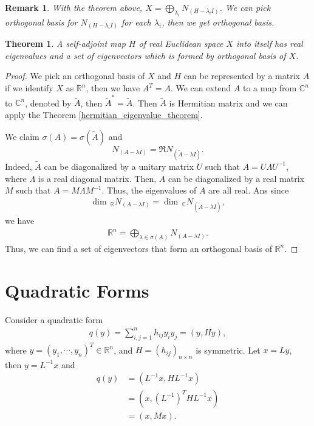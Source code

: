 \documentclass[11pt]{book}
\newtheorem{theorem}{Theorem}[chapter]
\newtheorem{remark}{Remark}[chapter]
\theoremstyle{definition}
\numberwithin{equation}{chapter}
\begin{document}
\medskip


\begin{remark}
With the theorem above, $X = \bigoplus_{\lambda_i}N_{(H-\lambda_i I)}$. We can pick orthogonal basis for $N_{(H-\lambda_i I)}$ for each $\lambda_i$, then we get orthogonal basis.
\end{remark}

\medskip

\begin{theorem}\label{theorem_symmetric}
A self-adjoint map $H$ of real Euclidean space $X$ into itself has real eigenvalues and a set of eigenvectors which is formed by orthogonal basis of $X$.
\end{theorem}
\begin{proof}
We pick an orthogonal basis of $X$ and $H$ can be represented by a matrix $A$ if we identify $X$ as $\mathbb{R}^n$, then we have $A^T = A$. We can extend $A$ to a map from $\mathbb{C}^n$ to $\mathbb{C}^n$, denoted by $\widetilde{A}$, then $\widetilde{A}^* = \widetilde{A}$. Then $\widetilde{A}$ is Hermitian matrix and we can apply the Theorem \ref{hermitian_eigenvalue_theorem}.

We claim $\sigma(A) = \sigma \left(\widetilde{A}\right)$ and $$N_{(A - \lambda I)} = \Re N_{\left(\widetilde{A} - \lambda I\right)}.$$
Indeed, $\widetilde{A}$ can be diagonalized by a unitary matrix $U$ such that $A = U\Lambda U^{-1}$, where $\Lambda$ is a real diagonal matrix. Then, $A$ can be diagonalized by a real matrix $M$ such that $A = M\Lambda M^{-1}$. Thus, the eigenvalues of $A$ are all real. Ans since
\begin{align*}
    \dim \,_{\mathbb{R}} N_{(A - \lambda I)} = \dim \,_{\mathbb{C}} N_{\left(\widetilde{A} - \lambda I\right)},
\end{align*}
we have 
\begin{align*}
    \mathbb{R}^n = \bigoplus_{\lambda \in \sigma(A)} N_{(A - \lambda I)}.
\end{align*}
Thus, we can find a set of eigenvectors that form an orthogonal basis of $\mathbb{R}^n$.
\end{proof}


\medskip

\section{Quadratic Forms}
Consider a quadratic form
\begin{align*}
    q(y) = \sum^n_{i,j=1} h_{ij} y_i y_j = (y, Hy),
\end{align*}
where $y = (y_1, \cdots, y_n)^T \in \mathbb{R}^n$, and $H = (h_{ij})_{n\times n}$ is symmetric. Let $x = Ly$, then $y = L^{-1}x$ and
\begin{align*}
    q(y) & = \left(L^{-1}x, H L^{-1}x\right) \\
    & = \left(x, \left(L^{-1}\right)^T H L^{-1}x\right) \\
    & = (x, Mx).
\end{align*}
\end{document}
